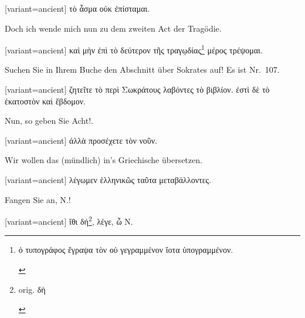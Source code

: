 \begin{greek}[variant=ancient]%
τὸ ἆσμα οὐκ ἐπίσταμαι.

\end{greek}%
\switchcolumn*

Doch ich wende mich nun zu dem zweiten Act der Tragödie. 

\switchcolumn

\begin{greek}[variant=ancient]%
καὶ μὴν ἐπὶ τὸ δεύτερον τῆς τραγῳδίας\footnote{\begin{latin}%
\textgreek[variant=ancient]{ὁ τυπογράφος ἔγραψα τὸν οὐ γεγραμμένον
ἴοτα ὑπογραμμένον.}\end{latin}%
} μέρος τρέψομαι.

\end{greek}%
Suchen Sie in Ihrem Buche den Abschnitt über Sokrates auf! Es ist
Nr.\ 107.

\switchcolumn

\begin{greek}[variant=ancient]%
ζητεῖτε τὸ περὶ Σωκράτους λαβόντες τὸ βιβλίον. ἐστὶ δὲ τὸ ἐκατοστὸν
καὶ ἕβδομον. 

\end{greek}%
\switchcolumn*

Nun, so geben Sie Acht!.

\switchcolumn

\begin{greek}[variant=ancient]%
ἀλλὰ προσέχετε τὸν νοῦν.

\end{greek}%
\switchcolumn*

Wir wollen das (mündlich) in's Griechische übersetzen.

\switchcolumn

\begin{greek}[variant=ancient]%
λέγωμεν ἑλληνικῶς ταῦτα μεταβάλλοντες.

\end{greek}%
\switchcolumn*

Fangen Sie an, N.!

\switchcolumn

\begin{greek}[variant=ancient]%
ἴθι δή\footnote{\begin{latin}%
orig. \textgreek[variant=ancient]{δὴ}\end{latin}%
}, λέγε, ὦ Ν.

\end{greek}%
\switchcolumn*

